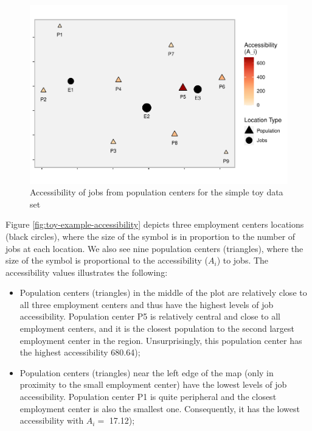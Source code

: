 \documentclass[]{elsarticle} %
\begin{document}
\begin{figure}
\includegraphics[width=1\linewidth]{Spatial-Availability_files/figure-latex/toy-example-accessibility-plot-1} \caption{\label{fig:toy-example-accessibility}Accessibility of jobs from population centers for the simple toy data set}\label{fig:toy-example-accessibility-plot}
\end{figure}

Figure \ref{fig:toy-example-accessibility} depicts three employment
centers locations (black circles), where the size of the symbol is in
proportion to the number of jobs at each location. We also see nine
population centers (triangles), where the size of the symbol is
proportional to the accessibility (\(A_i\)) to jobs. The accessibility
values illustrates the following:

\begin{itemize}
\item
  Population centers (triangles) in the middle of the plot are
  relatively close to all three employment centers and thus have the
  highest levels of job accessibility. Population center P5 is
  relatively central and close to all employment centers, and it is the
  closest population to the second largest employment center in the
  region. Unsurprisingly, this population center has the highest
  accessibility 680.64);
\item
  Population centers (triangles) near the left edge of the map (only in
  proximity to the small employment center) have the lowest levels of
  job accessibility. Population center P1 is quite peripheral and the
  closest employment center is also the smallest one. Consequently, it
  has the lowest accessibility with \(A_i=\) 17.12);
\end{itemize}
\end{document}
